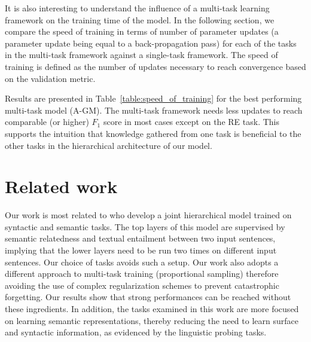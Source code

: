 \documentclass[letterpaper]{article} %
\begin{document}
It is also interesting to understand the influence of a multi-task learning framework on the training time of the model. In the following section, we compare the speed of training in terms of number of parameter updates (a parameter update being equal to a back-propagation pass) for each of the tasks in the multi-task framework against a single-task framework. The speed of training is defined as the number of updates necessary to reach convergence based on the validation metric.

Results are presented in Table~\ref{table:speed_of_training} for the best performing multi-task model (A-GM). The multi-task framework needs less updates to reach comparable (or higher) $F_{1}$ score in most cases except on the RE task. This supports the intuition that knowledge gathered from one task is beneficial to the other tasks in the hierarchical architecture of our model.

\begin{table}
\centering
\caption{Speed of training: Difference in number of updates necessary before convergence: Multi-task (Full Model: A-GM) compared to single task. We report the differences in $F_{1}$ performance. Lower time is better, higher performance is better.}
\label{table:speed_of_training}
\end{table}



\section{Related work}

Our work is most related to \citeauthor{Hashimoto2017}  who develop a joint hierarchical model trained on syntactic and semantic tasks. The top layers of this model are supervised by semantic relatedness and textual entailment between two input sentences, implying that the lower layers need to be run two times on different input sentences. Our choice of tasks avoids such a setup. Our work also adopts a different approach to multi-task training (proportional sampling) therefore avoiding the use of complex regularization schemes to prevent catastrophic forgetting. Our results show that strong performances can be reached without these ingredients. In addition, the tasks examined in this work are more focused on learning semantic representations, thereby reducing the need to learn surface and syntactic information, as evidenced by the linguistic probing tasks.
\end{document}
